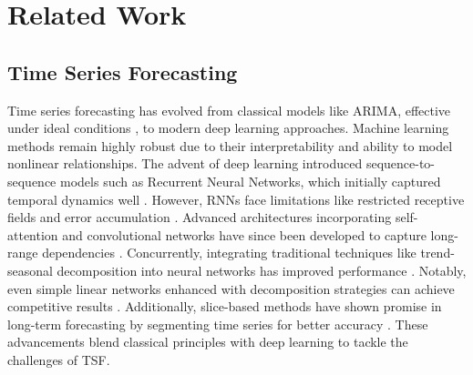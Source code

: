\vspace{-0.06in}
\section{Related Work}
\subsection{Time Series Forecasting}
Time series forecasting has evolved from classical models like ARIMA, effective under ideal conditions \citep{box1968some,zhang2003time}, to modern deep learning approaches. 
Machine learning methods \citep{chen2016xgboost,ke2017lightgbm} remain highly robust due to their interpretability and ability to model nonlinear relationships.  The advent of deep learning introduced sequence-to-sequence models such as Recurrent Neural Networks, which initially captured temporal dynamics well \citep{hewamalage2021recurrent,salinas2020deepar}. However, RNNs face limitations like restricted receptive fields and error accumulation \citep{salinas2020deepar}. Advanced architectures incorporating self-attention and convolutional networks have since been developed to capture long-range dependencies \citep{lai2018modeling,li2019enhancing}. Concurrently, integrating traditional techniques like trend-seasonal decomposition into neural networks has improved performance \citep{wen2020fast}. Notably, even simple linear networks enhanced with decomposition strategies can achieve competitive results \citep{zeng2023transformers}. Additionally, slice-based methods have shown promise in long-term forecasting by segmenting time series for better accuracy \citep{nie2022time,zhang2023crossformer}. These advancements blend classical principles with deep learning to tackle the challenges of TSF.

\vspace{-0.06in}

